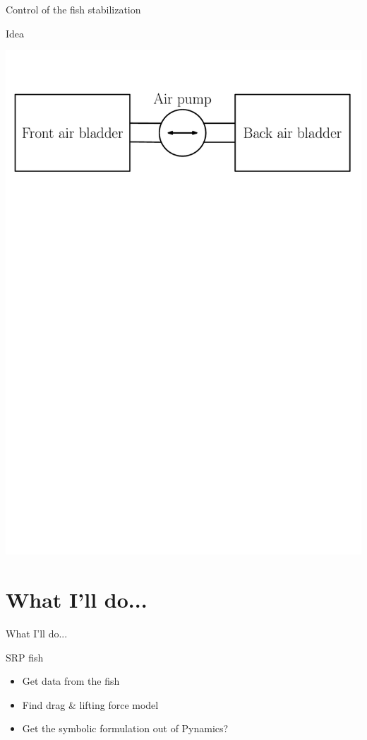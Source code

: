 \documentclass[aspectratio=169, xcolor=table]{beamer}
\begin{document}
\begin{frame}{Control of the fish stabilization}
\begin{block}{Idea}
\begin{center}
\includegraphics[scale=0.5]{Bladder_Idea.pdf}
\end{center}
\end{block}
\end{frame}


\section*{What I'll do...}

\begin{frame}{What I'll do...}
\begin{block}{SRP fish}
\begin{itemize}
\item Get data from the fish
\item Find drag \& lifting force model
\item Get the symbolic formulation out of Pynamics\color{red}\large ?\normalsize \color{black}
\end{itemize}
\end{block}
\end{frame}
\end{document}
